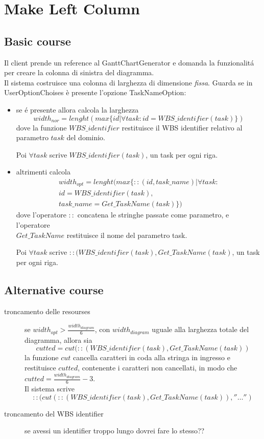\section{Make Left Column}
\label{seq:GanttMakeLeftColumn}
\subsection{Basic course}
Il client prende un reference al GanttChartGenerator e domanda la funzionalit\'a
per creare la colonna di sinistra del diagramma. \\
Il sistema costruisce una colonna di larghezza di dimensione \emph{fissa}.
Guarda se in UserOptionChoises \`e presente l'opzione TaskNameOption:
\begin{itemize}
  \item se \'e presente allora calcola la larghezza
\begin{displaymath}
	width_{nor}=lenght(max\lbrace id | \forall task: id =
WBS\_identifier(task) \rbrace) 
\end{displaymath}
dove la funzione $WBS\_identifier$ restituisce il WBS identifier relativo al 
parametro $task$ del dominio.

Poi $\forall task$ scrive $WBS\_identifier(task)$, un task per ogni riga.

\item altrimenti calcola
\begin{eqnarray}
width_{opt}=lenght(max\lbrace ::(id, task\_name) | \forall task: \\ id =
WBS\_identifier(task), \\ task\_name = Get\_TaskName(task)
\rbrace)
\end{eqnarray}
dove l'operatore $::$ concatena le stringhe passate come parametro, e
l'operatore \\$Get\_TaskName$ restituisce il nome del parametro
task.

Poi $\forall task$ scrive $::(WBS\_identifier(task), Get\_TaskName(task)$, un
task per ogni riga.
\end{itemize}

\subsection{Alternative course}
\begin{description}
\item[troncamento delle resourses] se $width_{opt} >
\frac{width_{diagram}}{6}$, con $width_{diagram}$ uguale alla larghezza totale
del diagramma, allora sia 
\begin{equation}cutted = cut(::(WBS\_identifier(task),
Get\_TaskName(task))\end{equation} 
la funzione $cut$ cancella caratteri in coda alla stringa in ingresso e
restituisce $cutted$, contenente i caratteri non cancellati, in modo che $cutted
= \frac{width_{diagram}}{6}-3$. \\ Il sistema scrive 
\begin{equation} 
::(cut(::(WBS\_identifier(task), Get\_TaskName(task)), ''\ldots'')
\end{equation}
\item[troncamento del WBS identifier] se avessi un identifier troppo lungo
dovrei fare lo stesso??
\end{description}
